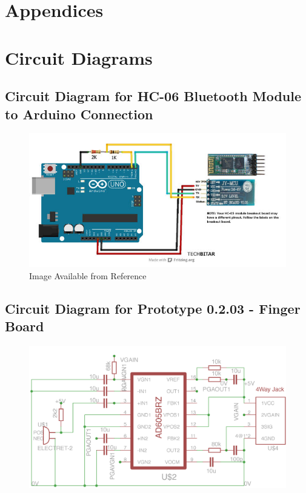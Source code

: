 \section{Appendices}
\appendix

\section{Circuit Diagrams} \label{Circuit Diagrams}


\subsection{Circuit Diagram for HC-06 Bluetooth Module to Arduino Connection}
\label{arduinobluetooth}
\begin{figure}[H]
\centering
\includegraphics[scale = 1]{Images/arduinobluetooth}
\caption*{Image Available from Reference~\cite{arduinobluetooth}}
\end{figure}

\subsection{Circuit Diagram for Prototype 0.2.03 - Finger Board}
\label{fingerboardsch}
\begin{figure}[H]
\centering
\includegraphics[scale = 1]{Images/mic_schematic_01}
\end{figure}

